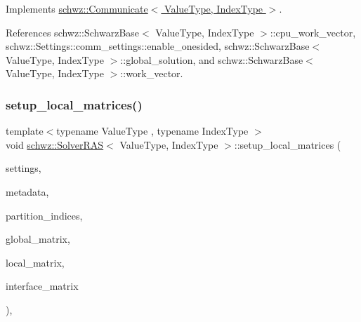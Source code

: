 Implements \hyperlink{classschwz_1_1Communicate_a9f305bc37b86b1cf9369acdf6fe32f7d}{schwz\+::\+Communicate$<$ Value\+Type, Index\+Type $>$}.



References schwz\+::\+Schwarz\+Base$<$ Value\+Type, Index\+Type $>$\+::cpu\+\_\+work\+\_\+vector, schwz\+::\+Settings\+::comm\+\_\+settings\+::enable\+\_\+onesided, schwz\+::\+Schwarz\+Base$<$ Value\+Type, Index\+Type $>$\+::global\+\_\+solution, and schwz\+::\+Schwarz\+Base$<$ Value\+Type, Index\+Type $>$\+::work\+\_\+vector.

\mbox{\label{classschwz_1_1SolverRAS_aebbdd245b7019af802606ad95a8e3a5a}} 
\subsubsection{\texorpdfstring{setup\+\_\+local\+\_\+matrices()}{setup\_local\_matrices()}}
{\footnotesize\ttfamily template$<$typename Value\+Type , typename Index\+Type $>$ \\
void \hyperlink{classschwz_1_1SolverRAS}{schwz\+::\+Solver\+R\+AS}$<$ Value\+Type, Index\+Type $>$\+::setup\+\_\+local\+\_\+matrices (\begin{DoxyParamCaption}\item[{\hyperlink{structschwz_1_1Settings}{Settings} \&}]{settings,  }\item[{\hyperlink{structschwz_1_1Metadata}{Metadata}$<$ Value\+Type, Index\+Type $>$ \&}]{metadata,  }\item[{std\+::vector$<$ unsigned int $>$ \&}]{partition\+\_\+indices,  }\item[{std\+::shared\+\_\+ptr$<$ gko\+::matrix\+::\+Csr$<$ Value\+Type, Index\+Type $>$$>$ \&}]{global\+\_\+matrix,  }\item[{std\+::shared\+\_\+ptr$<$ gko\+::matrix\+::\+Csr$<$ Value\+Type, Index\+Type $>$$>$ \&}]{local\+\_\+matrix,  }\item[{std\+::shared\+\_\+ptr$<$ gko\+::matrix\+::\+Csr$<$ Value\+Type, Index\+Type $>$$>$ \&}]{interface\+\_\+matrix }\end{DoxyParamCaption})\hspace{0.3cm}{\ttfamily [override]}, {\ttfamily [virtual]}}



